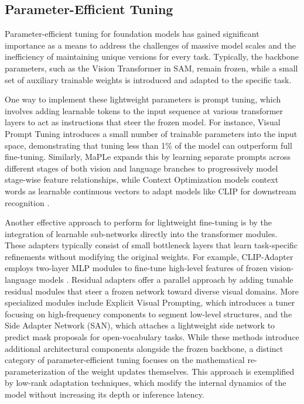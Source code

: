 \subsection{Parameter-Efficient Tuning}
Parameter-efficient tuning for foundation models has gained significant importance as a means to address the challenges of massive model scales and the inefficiency of maintaining unique versions for every task. Typically, the backbone parameters, such as the Vision Transformer in SAM, remain frozen, while a small set of auxiliary trainable weights is introduced and adapted to the specific task.  

One way to implement these lightweight parameters is prompt tuning, which involves adding learnable tokens to the input sequence at various transformer layers to act as instructions that steer the frozen model. For instance, Visual Prompt Tuning  introduces a small number of trainable parameters into the input space\cite{jia2022visual}, demonstrating that tuning less than 1\% of the model can outperform full fine-tuning. Similarly, MaPLe expands this by learning separate prompts across different stages of both vision and language branches to progressively model stage-wise feature relationships\cite{khattak2023maple}, while Context Optimization models context words as learnable continuous vectors to adapt models like CLIP for downstream recognition \cite{zhou2022learning}.

Another effective approach to perform for lightweight fine-tuning is by the integration of learnable sub-networks directly into the transformer modules. These adapters typically consist of small bottleneck layers that learn task-specific refinements without modifying the original weights. For example, CLIP-Adapter employs two-layer MLP modules to fine-tune high-level features of frozen vision-language models \cite{gao2025clipadapterbettervisionlanguagemodels}. Residual adapters offer a parallel approach by adding tunable residual modules that steer a frozen network toward diverse visual domains\cite{rebuffi2017learningmultiplevisualdomains}. More specialized modules include Explicit Visual Prompting, which introduces a tuner focusing on high-frequency components to segment low-level structures\cite{liu2023explicitvisualpromptinglowlevel}, and the Side Adapter Network (SAN), which attaches a lightweight side network to predict mask proposals for open-vocabulary tasks\cite{xu2023adapternetworkopenvocabularysemantic}. While these methods introduce additional architectural components alongside the frozen backbone, a distinct category of parameter-efficient tuning focuses on the mathematical re-parameterization of the weight updates themselves. This approach is exemplified by low-rank adaptation techniques, which modify the internal dynamics of the model without increasing its depth or inference latency.

